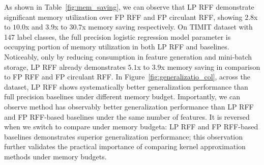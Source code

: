 As shown in Table~\ref{fig:mem_saving}, we can observe that LP RFF demonstrate significant memory utilization over FP RFF and FP circulant RFF, showing $2.8$x to $10.0$x and $3.9$x to $30.7$x memory saving respectively. On TIMIT dataset with 147 label classes, the full precision logistic regression model parameter is occupying  portion of memory utilization in both LP RFF and baselines. Noticeably, only by reducing consumption in feature generation and mini-batch storage, LP RFF already demonstrates $5.1$x to $3.9$x memory saving in comparison to FP RFF and FP circulant RFF. In Figure~\ref{fig:generalizatio_col}, across the dataset, LP RFF shows systematically better generalization performance than full precision baselines under different memory budget. Importantly, we can observe \Nystrom method has observably better generalization performance than LP RFF and FP RFF-based baselines under the same number of features. It is reversed when we switch to compare under memory budgeta: LP RFF and FP RFF-based baselines demonstrates superior generalization performance; this observation further validates the practical importance of comparing kernel approximation methods under memory budgets.



